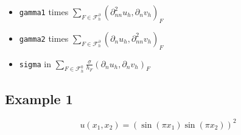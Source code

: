 \documentclass[11pt]{article}
\providecommand{\tightlist}{%
      \setlength{\itemsep}{0pt}\setlength{\parskip}{0pt}}
\begin{document}
    \begin{itemize}
\tightlist
\item
  \texttt{gamma1} times
  \(\sum_{F \in \mathcal{F}_{h}^{\partial}}\left(\partial_{n n}^{2} u_{h}, \partial_{n} v_{h}\right)_{F}\)
\item
  \texttt{gamma2} times
  \(\sum_{F \in \mathcal{F}_{h}^{\partial}}\left(\partial_{n} u_{h}, \partial_{n n}^{2} v_{h}\right)_{F}\)
\item
  \texttt{sigma} in
  \(\sum_{F \in \mathcal{F}_{h}^{0}} \frac{\sigma}{h_{F}}\left(\partial_{n} u_{h}, \partial_{n} v_{h}\right)_{F}\)
\end{itemize}

    \subsection{Example 1}\label{example-1}

\[
u\left(x_{1}, x_{2}\right)=\left(\sin \left(\pi x_{1}\right) \sin \left(\pi x_{2}\right)\right)^{2}
\]
\end{document}
